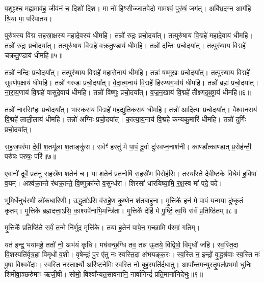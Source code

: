 प॒शूꣴश्च॒ मह्य॒माव॑ह॒ जीव॑नं च॒ दिशो॑ दिश। 
मा नो॑ हिꣳसीज्जातवेदो॒ गामश्वं॒ पुरु॑षं॒ जग॑त्। 
अबि॑भ्र॒दग्न॒ आग॑हि श्रि॒या मा॒ परि॑पातय।


 पुरु॑षस्य विद्म सहस्रा॒क्षस्य॑ महादे॒वस्य॑ धीमहि। 
 तन्नो॑ रुद्रः प्रचो॒दया᳚त्। 
 तत्पुरु॑षाय वि॒द्महे॑ महादे॒वाय॑ धीमहि। 
 तन्नो॑ रुद्रः प्रचो॒दया᳚त्। 
 तत्पुरु॑षाय वि॒द्महे॑ वक्रतु॒ण्डाय॑ धीमहि। 
 तन्नो॑ दन्तिः प्रचो॒दया᳚त्। 
 तत्पुरु॑षाय वि॒द्महे॑ चक्रतु॒ण्डाय॑ धीमहि॥५॥

 तन्नो॑ नन्दिः प्रचो॒दया᳚त्। 
 तत्पुरु॑षाय वि॒द्महे॑ महासे॒नाय॑ धीमहि। 
 तन्नः॑ षण्मुखः प्रचो॒दया᳚त्। 
 तत्पुरु॑षाय वि॒द्महे॑ सुवर्णप॒क्षाय॑ धीमहि। 
 तन्नो॑ गरुडः प्रचो॒दया᳚त्। 
 वे॒दा॒त्म॒नाय॑ वि॒द्महे॑ हिरण्यग॒र्भाय॑ धीमहि। 
 तन्नो᳚ ब्रह्म॑ प्रचो॒दया᳚त्। 
 ना॒रा॒य॒णाय॑ वि॒द्महे॑ वासुदे॒वाय॑ धीमहि। 
 तन्नो॑ विष्णुः प्रचो॒दया᳚त्। 
 व॒ज्र॒न॒खाय॑ वि॒द्महे॑ तीक्ष्णद॒ꣴ॒ष्ट्राय॑ धीमहि॥६॥
 
तन्नो॑ नारसिꣳहः प्रचो॒दया᳚त्। 
भा॒स्क॒राय॑ वि॒द्महे॑ महद्युतिक॒राय॑ धीमहि। 
तन्नो॑ आदित्यः प्रचो॒दया᳚त्। 
वै॒श्वा॒न॒राय॑ वि॒द्महे॑ लाली॒लाय॑ धीमहि। 
तन्नो॑ अग्निः प्रचो॒दया᳚त्। 
का॒त्या॒य॒नाय॑ वि॒द्महे॑ कन्यकु॒मारि॑ धीमहि। 
तन्नो॑ दुर्गिः प्रचो॒दया᳚त्। 


स॒ह॒स्र॒पर॑मा दे॒वी॒ श॒तमू॑ला श॒ताङ्कु॑रा। 
सर्वꣳ॑ हरतु॑ मे पा॒पं॒ दू॒र्वा दुः॑स्वप्न॒नाश॑नी। 
काण्डा᳚त्काण्डात् प्र॒रोह॑न्ती॒ परु॑षः परुषः॒ परि॑॥७॥

ए॒वानो॑ दूर्वे॒ प्रत॑नु स॒हस्रे॑ण श॒तेन॑ च। 
या श॒तेन॑ प्रत॒नोषि॑ स॒हस्रे॑ण वि॒रोह॑सि। 
तस्या᳚स्ते देवीष्टके वि॒धेम॑ ह॒विषा॑ व॒यम्। 
अश्व॑क्रा॒न्ते र॑थक्रा॒न्ते॒ वि॒ष्णुक्रा᳚न्ते व॒सुन्ध॑रा। 
शिरसा॑ धारयिष्या॒मि॒ र॒क्ष॒स्व मां᳚ पदे॒ पदे।

 भूमिर्धेनुर्धरणी लो॑कधा॒रिणी। 
 उ॒द्धृता॑ऽसि व॑राहे॒ण॒ कृ॒ष्णे॒न श॑तबा॒हुना। 
 मृ॒त्तिके॑ हन॑ मे पा॒पं॒ य॒न्म॒या दु॑ष्कृतं॒ कृतम्। 
 मृ॒त्तिके᳚ ब्रह्मदत्ता॒ऽसि॒ का॒श्यपे॑नाभि॒मन्त्रि॑ता। 
 मृ॒त्तिके॑ देहि॑ मे पु॒ष्टिं॒ त्व॒यि स॑र्वं प्र॒तिष्ठि॑तम्॥८॥
 
 मृ॒त्तिके᳚ प्रतिष्ठि॑ते स॒र्वं॒ त॒न्मे नि॑र्णुद॒ मृत्ति॑के। 
 तया॑ ह॒तेन॑ पापे॒न॒ ग॒च्छा॒मि प॑रमां॒ गतिम्।

यत॑ इन्द्र॒ भया॑महे॒ ततो॑ नो॒ अभ॑यं कृधि। 
मघ॑वन्छ॒ग्धि तव॒ तन्न॑ ऊ॒तये॒ विद्विषो॒ विमृधो॑ जहि। 
स्व॒स्ति॒दा वि॒शस्पति॑र्वृत्र॒हा विमृधो॑ व॒शी। 
वृषेन्द्रः॑ पु॒र ए॑तु नः स्वस्ति॒दा अ॑भयङ्क॒रः। 
स्व॒स्ति न॒ इन्द्रो॑ वृ॒द्धश्र॑वाः स्व॒स्ति नः॑ पू॒षा वि॒श्ववे॑दाः। 
स्व॒स्ति न॒स्तार्क्ष्यो॒ अरि॑ष्टनेमिः स्व॒स्ति नो॒ बृह॒स्पति॑र्दधातु। 
आपा᳚न्तमन्युस्तृ॒पल॑प्रभर्मा॒ धुनिः॒ शिमी॑वा॒ञ्छरु॑माꣳ ऋजी॒षी। 
सोमो॒ विश्वा᳚न्यत॒सावना॑नि॒ नार्वागिन्द्रं॑ प्रति॒माना॑निदेभुः॥९॥

